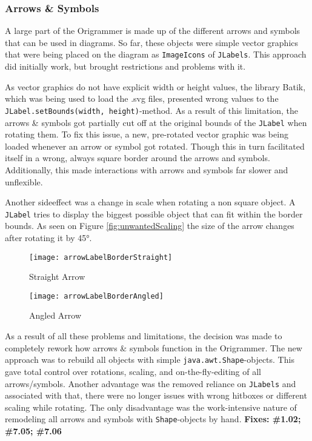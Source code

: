 \subsubsection{Arrows \& Symbols}
A large part of the Origrammer is made up of the different arrows and symbols that can be used in diagrams. So far, these objects were simple vector graphics that were being placed on the diagram as \texttt{ImageIcons} of \texttt{JLabels}. This approach did initially work, but brought restrictions and problems with it.

 As vector graphics do not have explicit width or height values, the library Batik\cite{batik}, which was being used to load the .svg files, presented wrong values to the \texttt{JLabel.setBounds(width, height)}-method. As a result of this limitation, the arrows \& symbols got partially cut off at the original bounds of the \texttt{JLabel} when rotating them. To fix this issue, a new, pre-rotated vector graphic was being loaded whenever an arrow or symbol got rotated. Though this in turn facilitated itself in a wrong, always square border around the arrows and symbols. Additionally, this made interactions with arrows and symbols far slower and unflexible.
 
 Another sideeffect was a change in scale when rotating a non square object. A \texttt{JLabel} tries to display the biggest possible object that can fit within the border bounds. As seen on Figure \ref{fig:unwantedScaling} the size of the arrow changes after rotating it by 45°.

\begin{figure*}[htbp]
	\centering
	\begin{subfigure}{0.3\textwidth}
		\texttt{[image: arrowLabelBorderStraight]}
		\caption{Straight Arrow}
		\label{fig:arrowLabelBorderStraight}
	\end{subfigure}
	\begin{subfigure}{0.3\textwidth}
		\texttt{[image: arrowLabelBorderAngled]}
		\caption{Angled Arrow}
		\label{fig:arrowLabelBorderAngled}
	\end{subfigure}
	\caption{Unwanted Scaling when Rotating}
	\label{fig:unwantedScaling}
\end{figure*}

As a result of all these problems and limitations, the decision was made to completely rework how arrows \& symbols function in the Origrammer. The new approach was to rebuild all objects with simple \texttt{java.awt.Shape}-objects. This gave total control over rotations, scaling, and on-the-fly-editing of all arrows/symbols. Another advantage was the removed reliance on \texttt{JLabels} and associated with that, there were no longer issues with wrong hitboxes or different scaling while rotating. The only disadvantage was the work-intensive nature of remodeling all arrows and symbols with \texttt{Shape}-objects by hand.
\newline
\textbf{Fixes: \#1.02; \#7.05; \#7.06}

